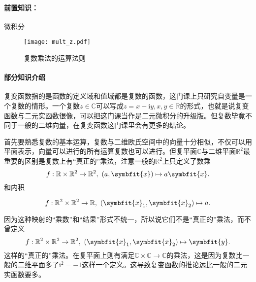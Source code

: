\paragraph{前置知识：}微积分

\begin{wrapfigure}{r}{6cm}
    \texttt{[image: mult\_z.pdf]}
    \caption{复数乘法的运算法则}
\end{wrapfigure}

\paragraph{部分知识介绍}

复变函数指的是函数的定义域和值域都是复数的函数，这门课上只研究自变量是一个复数的情形。一个复数$z\in\mathbb{C}$可以写成$z=x+\mathrm{i}y, x,y\in\mathbb{R}$的形式，也就是说复变函数与二元实函数很像，可以把这门课当作是二元微积分的升级版。但复数毕竟不同于一般的二维向量，在复变函数这门课里会有更多的结论。

首先要熟悉复数的基本运算，复数与二维欧氏空间中的向量十分相似，不仅可以用平面表示，向量可以进行的所有运算复数也可以进行。但复平面$\mathbb{C}$与二维平面$\mathbb{R}^2$最重要的区别是复数上有“真正的”乘法，注意一般的$\mathbb{R}^2$上只定义了数乘
\[
    f:\mathbb{R} \times \mathbb{R}^2  \to \mathbb{R}^2,~ (a,\symbfit{x})  \mapsto a\symbfit{x}
    .\]
和内积

\[
    f:\mathbb{R}^2 \times \mathbb{R}^2\to \mathbb{R},~(\symbfit{x}_1,\symbfit{x}_2) \mapsto a
    .\]



因为这种映射的“乘数”和“结果”形式不统一，所以说它们不是“真正的”乘法，而不曾定义
\[
    f:\mathbb{R}^2 \times \mathbb{R}^2\to \mathbb{R}^2,~(\symbfit{x}_1,\symbfit{x}_2) \mapsto \symbfit{y}
    .\]
这样的“真正的”乘法。在复平面上则有满足$\mathbb{C} \times \mathbb{C} \to \mathbb{C}$的乘法，这是因为复数比一般的二维平面多了$\mathrm{i}^2=-1$这样一个定义。这导致复变函数的推论远比一般的二元实函数要多。

